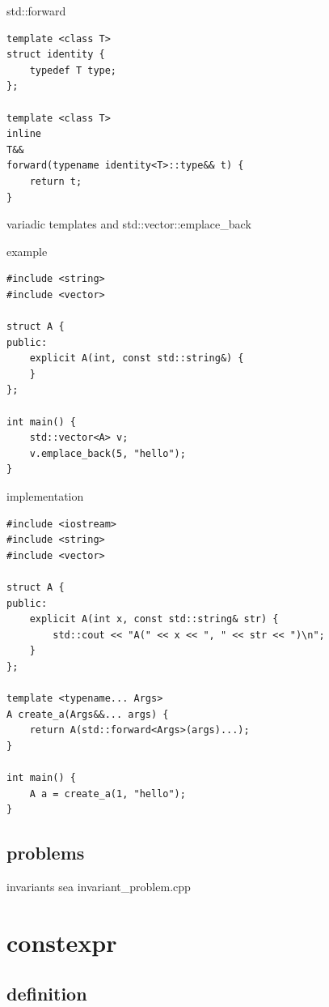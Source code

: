 \documentclass{beamer}
\begin{document}
\begin{frame}{std::forward}
\begin{verbatim}
template <class T>
struct identity {
    typedef T type;
};

template <class T>
inline
T&&
forward(typename identity<T>::type&& t) {
    return t;
}
\end{verbatim}
\end{frame}

\begin{frame}{variadic templates and std::vector::emplace\_back}
  \begin{block}{example}
\begin{verbatim}
#include <string>
#include <vector>

struct A {
public:
    explicit A(int, const std::string&) {
    }
};

int main() {
    std::vector<A> v;
    v.emplace_back(5, "hello");
}
\end{verbatim}
  \end{block}
\end{frame}

\begin{frame}
  \begin{block}{implementation}
\begin{verbatim}
#include <iostream>
#include <string>
#include <vector>

struct A {
public:
    explicit A(int x, const std::string& str) {
        std::cout << "A(" << x << ", " << str << ")\n";
    }
};

template <typename... Args>
A create_a(Args&&... args) {
    return A(std::forward<Args>(args)...);
}

int main() {
    A a = create_a(1, "hello");
}
\end{verbatim}
  \end{block}
\end{frame}

\subsection{problems}
\begin{frame}{invariants}
  sea invariant\_problem.cpp
\end{frame}

\section{constexpr}
\subsection{definition}
\end{document}
